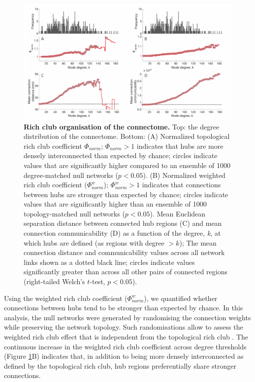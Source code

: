 \begin{figure}[h!]
\begin{center}
\includegraphics[width=1\textwidth]{Chapter5/Ch5Fig3.pdf}%
\end{center}
\caption{\textbf{Rich club organisation of the connectome.}
Top: the degree distribution of the connectome. Bottom:
(A) Normalized topological rich club coefficient $\Phi_{norm}$; $\Phi_{norm} >1$ indicates that hubs are more densely interconnected than expected by chance; circles indicate values that are significantly higher compared to an ensemble of 1000 degree-matched null networks ($p < 0.05$).
(B) Normalized weighted rich club coefficient ($\Phi_{norm}^{w}$); $\Phi_{norm}^{w}>1$ indicates that connections between hubs are stronger than expected by chance; circles indicate values that are significantly higher than an ensemble of 1000 topology-matched null networks ($p < 0.05$). Mean Euclidean separation distance between connected hub regions (C) and mean connection communicability (D) as a function of the degree, \textit{k}, at which hubs are defined (as regions with degree $> k$); The mean connection distance and communicability values across all network links shown as a dotted black line; circles indicate values significantly greater than across all other pairs of connected regions (right-tailed Welch’s $t$-test, $p < 0.05$).}
\label{fig:Ch5Fig3}
\end{figure}

Using the weighted rich club coefficient ($\Phi_{norm}^{w}$), we quantified whether connections between hubs tend to be stronger than expected by chance. In this analysis, the null networks were generated by randomising the connection weights while preserving the network topology. Such randomisations allow to assess the weighted rich club effect that is independent from the topological rich club \citep{Alstott2014}. The continuous increase in the weighted rich club coefficient across degree thresholds (Figure \ref{fig:Ch5Fig3}B) indicates that, in addition to being more densely interconnected as defined by the topological rich club, hub regions preferentially share stronger connections.

